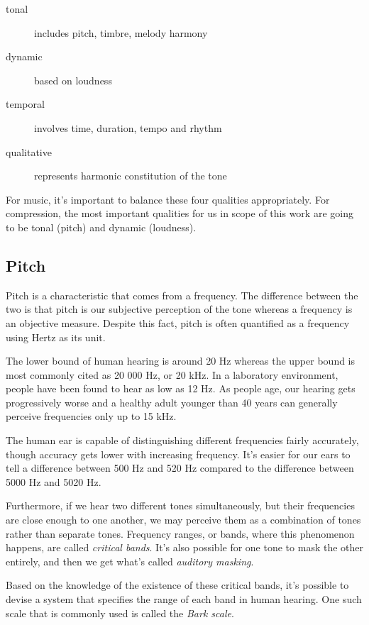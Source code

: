 \begin{description}
	\item[tonal] includes pitch, timbre, melody harmony
	\item[dynamic] based on loudness
	\item[temporal] involves time, duration, tempo and rhythm
	\item[qualitative] represents harmonic constitution of the tone
\end{description}

For music, it's important to balance these four qualities appropriately. For compression, the most important qualities for us in scope of this work are going to be tonal (pitch) and dynamic (loudness).

\subsection{Pitch}
Pitch is a characteristic that comes from a frequency. The difference between the two is that pitch is our subjective perception of the tone whereas a frequency is an objective measure. Despite this fact, pitch is often quantified as a frequency using Hertz as its unit.

The lower bound of human hearing is around 20 Hz whereas the upper bound is most commonly cited as 20 000 Hz, or 20 kHz. \cite{rosen1993hearing} In a laboratory environment, people have been found to hear as low as 12 Hz. As people age, our hearing gets progressively worse and a healthy adult younger than 40 years can generally perceive frequencies only up to 15 kHz. \cite{olson1967music}

The human ear is capable of distinguishing different frequencies fairly accurately, though accuracy gets lower with increasing frequency. It's easier for our ears to tell a difference between 500 Hz and 520 Hz compared to the difference between 5000 Hz and 5020 Hz. \cite{smacdon_2018}

Furthermore, if we hear two different tones simultaneously, but their frequencies are close enough to one another, we may perceive them as a combination of tones rather than separate tones. Frequency ranges, or bands, where this phenomenon happens, are called \emph{critical bands}. \cite{fletcher_1940} It's also possible for one tone to mask the other entirely, and then we get what's called \emph{auditory masking}. \cite{gelfand1990hearing}

Based on the knowledge of the existence of these critical bands, it's possible to devise a system that specifies the range of each band in human hearing. One such scale that is commonly used is called the \emph{Bark scale}.

